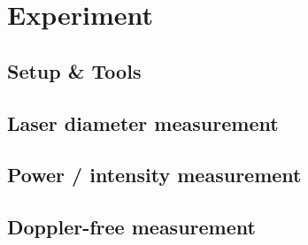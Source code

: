 
\chapter{Experiment}

\ifpdf{}
    \graphicspath{{Chapter2/Figs/Raster/}{Chapter2/Figs/PDF/}{Chapter2/Figs/}}
\else
    \graphicspath{{Chapter2/Figs/Vector/}{Chapter2/Figs/}}
\fi


\section{Setup \& Tools} %


\section{Laser diameter measurement} %


\section{Power / intensity measurement} %


\section{Doppler-free measurement} %

